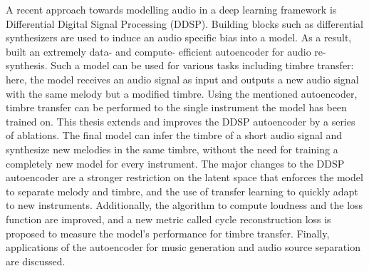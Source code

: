 
\begin{summary}

A recent approach towards modelling audio in a deep learning framework is Differential Digital Signal Processing (DDSP).
Building blocks such as differential synthesizers are used to induce an audio specific bias into a model.
As a result, \citet{ddsp} built an extremely data- and compute- efficient autoencoder for audio re-synthesis.
Such a model can be used for various tasks including timbre transfer: here, the model receives an audio signal as input and outputs a new audio signal with the same melody but a modified timbre. Using the mentioned autoencoder, timbre transfer can be performed to the single instrument the model has been trained on.\newline
This thesis extends and improves the DDSP autoencoder by a series of ablations.
The final model can infer the timbre of a short audio signal and synthesize new melodies in the same timbre, without the need for training a completely new model for every instrument. \newline
The major changes to the DDSP autoencoder are a stronger restriction on the latent space that enforces the model to separate melody and timbre, and the use of transfer learning to quickly adapt to new instruments.
Additionally, the algorithm to compute loudness and the loss function are improved, and a new metric called cycle reconstruction loss is proposed to measure the model's performance for timbre transfer. \newline
Finally, applications of the autoencoder for music generation and audio source separation are discussed.


\end{summary}


